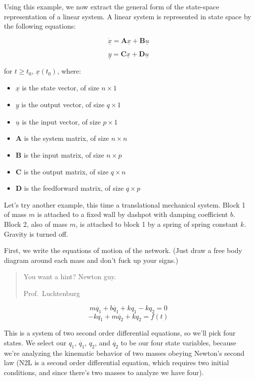 \documentclass[
  letterpaper,
  DIV=11,
  numbers=noendperiod]{scrreprt}
\providecommand{\tightlist}{%
  \setlength{\itemsep}{0pt}\setlength{\parskip}{0pt}}\usepackage{longtable,booktabs,array}
\begin{document}
Using this example, we now extract the general form of the state-space
representation of a linear system. A linear system is represented in
state space by the following equations:

\[\underline{\dot{x}} = \textbf{A} \underline{x} + \textbf{B} \underline{u}\]

\[\underline{y} = \textbf{C} \underline{x} + \textbf{D} \underline{u}\]

for \(t \ge t_0\), \(\underline{x}(t_0)\), where:

\begin{itemize}
\tightlist
\item
  \(\underline{x}\) is the state vector, of size \(n \times 1\)
\item
  \(\underline{y}\) is the output vector, of size \(q \times 1\)
\item
  \(\underline{u}\) is the input vector, of size \(p \times 1\)
\item
  \(\textbf{A}\) is the system matrix, of size \(n \times n\)
\item
  \(\textbf{B}\) is the input matrix, of size \(n \times p\)
\item
  \(\textbf{C}\) is the output matrix, of size \(q \times n\)
\item
  \(\textbf{D}\) is the feedforward matrix, of size \(q \times p\)
\end{itemize}

Let's try another example, this time a translational mechanical system.
Block 1 of mass \(m\) is attached to a fixed wall by dashpot with
damping coefficient \(b\). Block 2, also of mass \(m\), is attached to
block 1 by a spring of spring constant \(k\). Gravity is turned off.

First, we write the equations of motion of the network. (Just draw a
free body diagram around each mass and don't fuck up your signs.)

\begin{quote}
You want a hint? Newton guy.

Prof.~Luchtenburg
\end{quote}

\[m \ddot{q_1} + b \dot{q_1} + k q_1 - k q_2 = 0\]
\[-kq_1 + m \ddot{q_2} + k q_2 = f(t)\]

This is a system of two second order differential equations, so we'll
pick four states. We select our \(q_1\), \(\dot{q_1}\), \(q_2\), and
\(\dot{q_2}\) to be our four state variables, because we're analyzing
the kinematic behavior of two masses obeying Newton's second law (N2L is
a second order differential equation, which requires two initial
conditions, and since there's two masses to analyze we have four).
\end{document}
